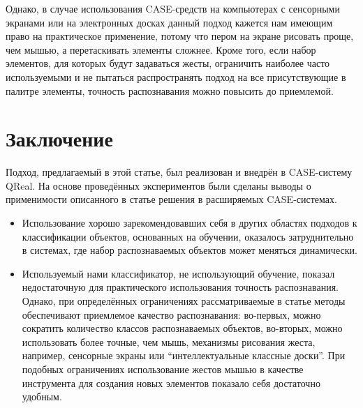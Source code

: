 \documentclass[a5paper]{article}
\begin{document}
Однако, в случае использования CASE-средств на компьютерах с сенсорными экранами или на электронных досках данный подход кажется нам имеющим право на практическое применение, потому что пером на экране рисовать проще, чем мышью, а перетаскивать элементы сложнее. Кроме того, если набор элементов, для которых будут задаваться жесты, ограничить наиболее часто используемыми и не пытаться распространять подход на все присутствующие в палитре элементы, точность распознавания можно повысить до приемлемой.

\section{Заключение}
Подход, предлагаемый в этой статье, был реализован и внедрён в CASE-систему QReal. На основе проведённых экспериментов были сделаны выводы о применимости описанного в статье решения в расширяемых CASE-системах.
\begin{itemize}
  \item Использование хорошо зарекомендовавших себя в других областях подходов к классификации объектов, основанных на обучении, оказалось затруднительно в системах, где набор распознаваемых объектов может меняться динамически.
  \item Используемый нами классификатор, не использующий обучение, показал недостаточную для практического использования точность распознавания. Однако, при определённых ограничениях рассматриваемые в статье методы обеспечивают приемлемое качество распознавания: во-первых, можно сократить количество классов  распознаваемых объектов, во-вторых, можно использовать более точные, чем мышь, механизмы рисования жеста, например, сенсорные экраны или ``интеллектуальные классные доски''. При подобных ограничениях использование жестов мышью в качестве инструмента для создания новых элементов показало себя достаточно удобным.
\end{itemize}

\pagebreak
\end{document}
